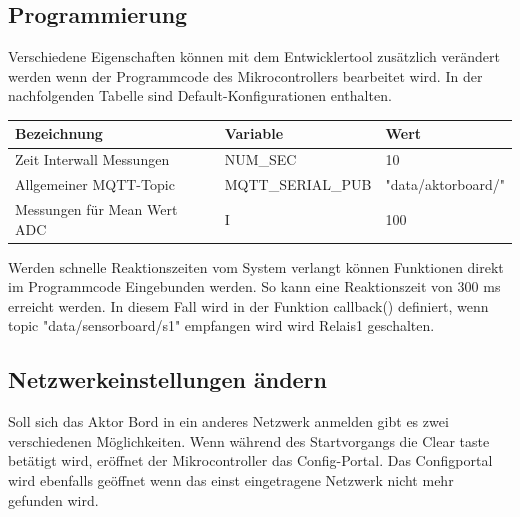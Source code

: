 \subsection{Programmierung}
Verschiedene Eigenschaften können mit dem Entwicklertool zusätzlich verändert werden wenn der Programmcode des Mikrocontrollers bearbeitet wird. In der nachfolgenden Tabelle sind Default-Konfigurationen enthalten.
\begin{table}[H]
\centering
\begin{tabular}{|l|l|l|}
	\hline 
	Bezeichnung & Variable & Wert \\ 
	\hline 
	Zeit Interwall Messungen & NUM\_SEC & 10 \\ 
	\hline 
	Allgemeiner MQTT-Topic  & MQTT\_SERIAL\_PUB & "data/aktorboard/" \\ 
	\hline 
	Messungen für Mean Wert ADC & I & 100 \\ 
	\hline  
\end{tabular} 	
\end{table}
Werden schnelle Reaktionszeiten vom System verlangt können Funktionen direkt im Programmcode Eingebunden werden. So kann eine Reaktionszeit von 300 ms erreicht werden. In diesem Fall wird in der Funktion callback() definiert, wenn topic "data/sensorboard/s1" empfangen wird wird Relais1 geschalten.
\subsection{Netzwerkeinstellungen ändern}
Soll sich das Aktor Bord in ein anderes Netzwerk anmelden gibt es zwei verschiedenen Möglichkeiten. Wenn während des Startvorgangs die Clear taste betätigt wird, eröffnet der Mikrocontroller das Config-Portal. Das Configportal wird ebenfalls geöffnet wenn das einst eingetragene Netzwerk nicht mehr gefunden wird.


